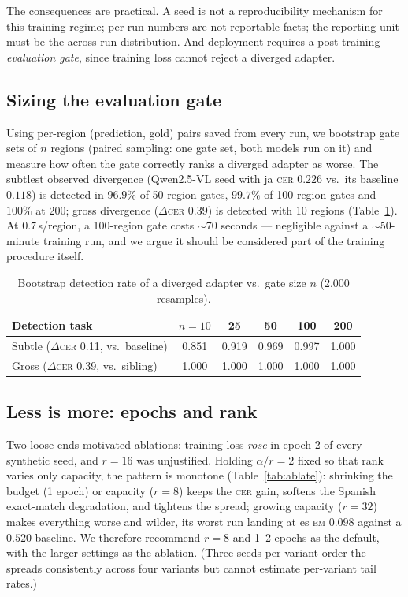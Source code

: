\documentclass[11pt]{article}
\newcommand{\cer}{\textsc{cer}}
\newcommand{\EM}{\textsc{em}}
\begin{document}
The consequences are practical. A seed is not a reproducibility mechanism
for this training regime; per-run numbers are not reportable facts; the
reporting unit must be the across-run distribution. And deployment requires
a post-training \emph{evaluation gate}, since training loss cannot reject a
diverged adapter.

\subsection{Sizing the evaluation gate}\label{sec:gate}

Using per-region (prediction, gold) pairs saved from every run, we bootstrap
gate sets of $n$ regions (paired sampling: one gate set, both models run on
it) and measure how often the gate correctly ranks a diverged adapter as
worse. The subtlest observed divergence (Qwen2.5-VL seed with ja \cer{}
$0.226$ vs.\ its baseline $0.118$) is detected in $96.9\%$ of 50-region
gates, $99.7\%$ of 100-region gates and $100\%$ at 200; gross divergence
($\Delta$\cer{} $0.39$) is detected with 10 regions
(Table~\ref{tab:gate}). At $0.7$\,s/region, a 100-region gate costs
$\sim$70 seconds --- negligible against a $\sim$50-minute training run, and
we argue it should be considered part of the training procedure itself.

\begin{table}[t]
\centering\small
\caption{Bootstrap detection rate of a diverged adapter vs.\ gate size $n$
(2{,}000 resamples).}
\label{tab:gate}
\begin{tabular}{lccccc}
\toprule
Detection task & $n{=}10$ & 25 & 50 & 100 & 200 \\
\midrule
Subtle ($\Delta$\cer{} 0.11, vs.\ baseline) & 0.851 & 0.919 & 0.969 & 0.997 & 1.000 \\
Gross ($\Delta$\cer{} 0.39, vs.\ sibling)   & 1.000 & 1.000 & 1.000 & 1.000 & 1.000 \\
\bottomrule
\end{tabular}
\end{table}

\subsection{Less is more: epochs and rank}\label{sec:ablate}

Two loose ends motivated ablations: training loss \emph{rose} in epoch 2 of
every synthetic seed, and $r{=}16$ was unjustified. Holding $\alpha/r=2$
fixed so that rank varies only capacity, the pattern is monotone
(Table~\ref{tab:ablate}): shrinking the budget (1 epoch) or capacity
($r{=}8$) keeps the \cer{} gain, softens the Spanish exact-match
degradation, and tightens the spread; growing capacity ($r{=}32$) makes
everything worse and wilder, its worst run landing at es \EM{} $0.098$
against a $0.520$ baseline. We therefore recommend $r{=}8$ and 1--2 epochs
as the default, with the larger settings as the ablation. (Three seeds per
variant order the spreads consistently across four variants but cannot
estimate per-variant tail rates.)
\end{document}
